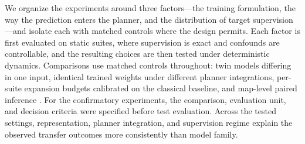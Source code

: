 \documentclass[letterpaper]{article} %
\begin{document}
We organize the experiments around three factors---the training formulation, the way the prediction enters the planner, and the distribution of target supervision---and isolate each with matched controls where the design permits. Each factor is first evaluated on static suites, where supervision is exact and confounds are controllable, and the resulting choices are then tested under deterministic dynamics. Comparisons use matched controls throughout: twin models differing in one input, identical trained weights under different planner integrations, per-suite expansion budgets calibrated on the classical baseline, and map-level paired inference \citep{henderson2018matters,agarwal2021precipice,pineau2021reproducibility}. For the confirmatory experiments, the comparison, evaluation unit, and decision criteria were specified before test evaluation. Across the tested settings, representation, planner integration, and supervision regime explain the observed transfer outcomes more consistently than model family.
\end{document}
